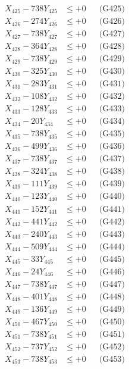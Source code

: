 \documentclass[a4paper,10pt]{article}
\begin{document}
{\begin{align}
X_{425} - 738Y_{425} &\leq +0 && \text{(G425)} \\
X_{426} - 274Y_{426} &\leq +0 && \text{(G426)} \\
X_{427} - 738Y_{427} &\leq +0 && \text{(G427)} \\
X_{428} - 364Y_{428} &\leq +0 && \text{(G428)} \\
X_{429} - 738Y_{429} &\leq +0 && \text{(G429)} \\
X_{430} - 325Y_{430} &\leq +0 && \text{(G430)} \\
\allowbreak
X_{431} - 283Y_{431} &\leq +0 && \text{(G431)} \\
X_{432} - 108Y_{432} &\leq +0 && \text{(G432)} \\
X_{433} - 128Y_{433} &\leq +0 && \text{(G433)} \\
X_{434} - 20Y_{434} &\leq +0 && \text{(G434)} \\
X_{435} - 738Y_{435} &\leq +0 && \text{(G435)} \\
X_{436} - 499Y_{436} &\leq +0 && \text{(G436)} \\
X_{437} - 738Y_{437} &\leq +0 && \text{(G437)} \\
X_{438} - 324Y_{438} &\leq +0 && \text{(G438)} \\
X_{439} - 111Y_{439} &\leq +0 && \text{(G439)} \\
X_{440} - 123Y_{440} &\leq +0 && \text{(G440)} \\
\allowbreak
X_{441} - 152Y_{441} &\leq +0 && \text{(G441)} \\
X_{442} - 441Y_{442} &\leq +0 && \text{(G442)} \\
X_{443} - 240Y_{443} &\leq +0 && \text{(G443)} \\
X_{444} - 509Y_{444} &\leq +0 && \text{(G444)} \\
X_{445} - 33Y_{445} &\leq +0 && \text{(G445)} \\
X_{446} - 24Y_{446} &\leq +0 && \text{(G446)} \\
X_{447} - 738Y_{447} &\leq +0 && \text{(G447)} \\
X_{448} - 401Y_{448} &\leq +0 && \text{(G448)} \\
X_{449} - 136Y_{449} &\leq +0 && \text{(G449)} \\
X_{450} - 467Y_{450} &\leq +0 && \text{(G450)} \\
\allowbreak
X_{451} - 738Y_{451} &\leq +0 && \text{(G451)} \\
X_{452} - 737Y_{452} &\leq +0 && \text{(G452)} \\
X_{453} - 738Y_{453} &\leq +0 && \text{(G453)} \\

\end{align}}
\end{document}
